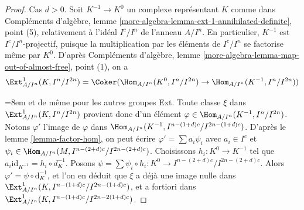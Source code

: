 \begin{proof}
Cas $d > 0$. Soit $K^{-1} \to K^0$ un complexe représentant $K$ comme dans Compléments d'algèbre, lemme \ref{more-algebra-lemma-ext-1-annihilated-definite}, point (5), relativement à l'idéal $I^c/I^n$ de l'anneau $A/I^n$. En particulier, $K^{-1}$ est $I^c/I^n$-projectif, puisque la multiplication par les éléments de $I^c/I^n$ se factorise même par $K^0$. D'après Compléments d'algèbre, lemme \ref{more-algebra-lemma-map-out-of-almost-free}, point (1), on a
$$
\Ext^1_{A/I^n}(K, I^n/I^{2n}) =
\Coker(\Hom_{A/I^n}(K^0, I^n/I^{2n}) \to \Hom_{A/I^n}(K^{-1}, I^n/I^{2n}))
$$
{\emergencystretch=8em
et de même pour les autres groupes Ext. Toute classe $\xi$ dans $\Ext^1_{A/I^n}(K, I^n/I^{2n})$ provient donc d'un élément $\varphi \in \Hom_{A/I^n}(K^{-1}, I^n/I^{2n})$. Notons $\varphi'$ l'image de $\varphi$ dans $\Hom_{A/I^n}(K^{-1}, I^{n - (1 + d)c}/I^{2n - (1 + d)c})$. D'après le lemme \ref{lemma-factor-hom}, on peut écrire $\varphi' = \sum a_i \psi_i$ avec $a_i \in I^c$ et $\psi_i \in \Hom_{A/I^n}(M, I^{n - (2 + d)c}/I^{2n - (2 + d)c})$. Choisissons $h_i : K^0 \to K^{-1}$ tel que $a_i \text{id}_{K^{-1}} = h_i \circ d_K^{-1}$. Posons $\psi = \sum \psi_i \circ h_i : K^0 \to I^{n - (2 + d)c}/I^{2n - (2 + d)c}$. Alors $\varphi' = \psi \circ \text{d}_K^{-1}$, et l'on en déduit que $\xi$ a déjà une image nulle dans $\Ext^1_{A/I^n}(K, I^{n - (1 + d)c}/I^{2n - (1 + d)c})$, et a fortiori dans $\Ext^1_{A/I^n}(K, I^{n - (1 + d)c}/I^{2n - 2(1 + d)c})$.
\par}


\end{proof}
